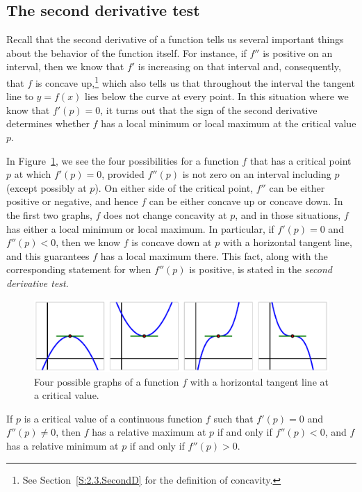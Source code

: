 \subsection*{The second derivative test}

Recall that the second derivative of a function tells us several important things about the behavior of the function itself.  For instance, if $f''$ is positive on an interval, then we know that $f'$ is increasing on that interval and, consequently, that $f$ is concave up,\footnote{See Section~\ref{S:2.3.SecondD} for the definition of concavity.} which also tells us that throughout the interval the tangent line to $y = f(x)$ lies below the curve at every point.  In this situation where we know that $f'(p) = 0$, it turns out that the sign of the second derivative determines whether $f$ has a local minimum or local maximum at the critical value $p$.

In Figure~\ref{fig:3.2.2Dtest}, we see the four possibilities for a function $f$ that has a critical point $p$ at which $f'(p) = 0$, provided $f''(p)$ is not zero on an interval including $p$ (except possibly at $p$).  On either side of the critical point, $f''$ can be either positive or negative, and hence $f$ can be either concave up or concave down.  In the first two graphs, $f$ does not change concavity at $p$, and in those situations, $f$ has either a local minimum or local maximum.  In particular, if $f'(p) = 0$ and $f''(p) < 0$, then we know $f$ is concave down at $p$ with a horizontal tangent line, and this guarantees $f$ has a local maximum there.  This fact, along with the corresponding statement for when $f''(p)$ is positive, is stated in the \emph{second derivative test}. 

\begin{figure} %
\includegraphics{figures/3_1_2Dtest.eps} %
\caption{Four possible graphs of a function $f$ with a horizontal tangent line at a critical value.} \label{fig:3.2.2Dtest}
\end{figure}

 { %
If $p$ is a critical value of a continuous function $f$ such that $f'(p) = 0$ and $f''(p) \ne 0$, then $f$ has a relative maximum at $p$ if and only if $f''(p) < 0$, and $f$ has a relative minimum at $p$ if and only if $f''(p) > 0$.
} %

